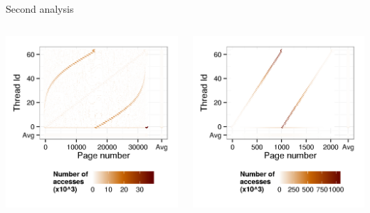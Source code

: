 \documentclass[xcolor={usenames,dvipsnames},hyperref={pdfusetitle}]{beamer}
\begin{document}
\begin{frame}{Second analysis}
    \begin{columns}
        \begin{column}{.45\linewidth}
            \includegraphics[width=\linewidth]  {tabarnac/is_b_kb2_modif}
        \end{column}
        \begin{column}{.45\linewidth}
            \includegraphics[width=\linewidth]  {tabarnac/is_b_kb1_modif}
        \end{column}
    \end{columns}
\end{frame}
\end{document}
